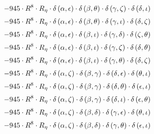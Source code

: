 \begin{subequations}
\begin{gather}
 \\[0.2em] \notag 		 - 945 \cdot R^{8} \cdot R_{\eta{}} \cdot \delta{}\left(\alpha{}, \epsilon{}\right) \cdot \delta{}\left(\beta{}, \theta{}\right) \cdot \delta{}\left(\gamma{}, \zeta{}\right) \cdot \delta{}\left(\delta{}, \iota{}\right) 
 \\[0.2em] \notag 		 - 945 \cdot R^{8} \cdot R_{\eta{}} \cdot \delta{}\left(\alpha{}, \epsilon{}\right) \cdot \delta{}\left(\beta{}, \theta{}\right) \cdot \delta{}\left(\gamma{}, \iota{}\right) \cdot \delta{}\left(\delta{}, \zeta{}\right) 
 \\[0.2em] \notag 		 - 945 \cdot R^{8} \cdot R_{\eta{}} \cdot \delta{}\left(\alpha{}, \epsilon{}\right) \cdot \delta{}\left(\beta{}, \iota{}\right) \cdot \delta{}\left(\gamma{}, \delta{}\right) \cdot \delta{}\left(\zeta{}, \theta{}\right) 
 \\[0.2em] \notag 		 - 945 \cdot R^{8} \cdot R_{\eta{}} \cdot \delta{}\left(\alpha{}, \epsilon{}\right) \cdot \delta{}\left(\beta{}, \iota{}\right) \cdot \delta{}\left(\gamma{}, \zeta{}\right) \cdot \delta{}\left(\delta{}, \theta{}\right) 
 \\[0.2em] \notag 		 - 945 \cdot R^{8} \cdot R_{\eta{}} \cdot \delta{}\left(\alpha{}, \epsilon{}\right) \cdot \delta{}\left(\beta{}, \iota{}\right) \cdot \delta{}\left(\gamma{}, \theta{}\right) \cdot \delta{}\left(\delta{}, \zeta{}\right) 
 \\[0.2em] \notag 		 - 945 \cdot R^{8} \cdot R_{\eta{}} \cdot \delta{}\left(\alpha{}, \zeta{}\right) \cdot \delta{}\left(\beta{}, \gamma{}\right) \cdot \delta{}\left(\delta{}, \epsilon{}\right) \cdot \delta{}\left(\theta{}, \iota{}\right) 
 \\[0.2em] \notag 		 - 945 \cdot R^{8} \cdot R_{\eta{}} \cdot \delta{}\left(\alpha{}, \zeta{}\right) \cdot \delta{}\left(\beta{}, \gamma{}\right) \cdot \delta{}\left(\delta{}, \theta{}\right) \cdot \delta{}\left(\epsilon{}, \iota{}\right) 
 \\[0.2em] \notag 		 - 945 \cdot R^{8} \cdot R_{\eta{}} \cdot \delta{}\left(\alpha{}, \zeta{}\right) \cdot \delta{}\left(\beta{}, \gamma{}\right) \cdot \delta{}\left(\delta{}, \iota{}\right) \cdot \delta{}\left(\epsilon{}, \theta{}\right) 
 \\[0.2em] \notag 		 - 945 \cdot R^{8} \cdot R_{\eta{}} \cdot \delta{}\left(\alpha{}, \zeta{}\right) \cdot \delta{}\left(\beta{}, \delta{}\right) \cdot \delta{}\left(\gamma{}, \epsilon{}\right) \cdot \delta{}\left(\theta{}, \iota{}\right) 
 \\[0.2em] \notag 		 - 945 \cdot R^{8} \cdot R_{\eta{}} \cdot \delta{}\left(\alpha{}, \zeta{}\right) \cdot \delta{}\left(\beta{}, \delta{}\right) \cdot \delta{}\left(\gamma{}, \theta{}\right) \cdot \delta{}\left(\epsilon{}, \iota{}\right) 

\end{gather}
\end{subequations}
